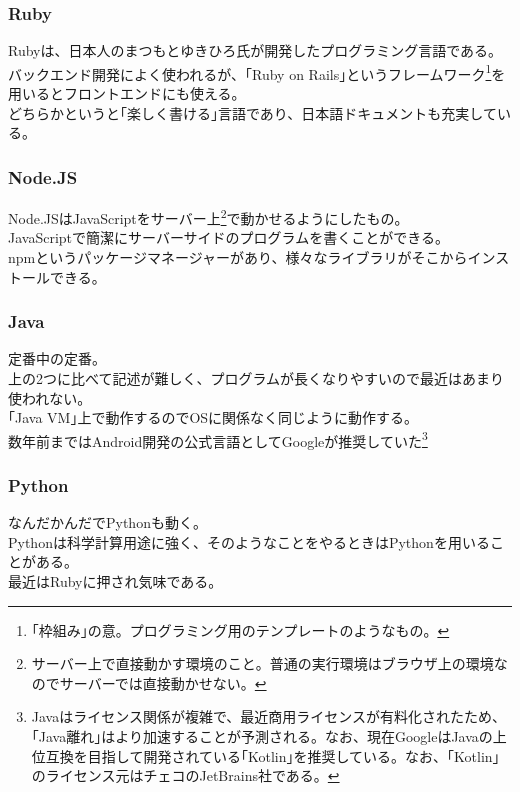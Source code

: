 \documentclass{ltjsarticle}
\begin{document}
\subsubsection{Ruby}
Rubyは、日本人のまつもとゆきひろ氏が開発したプログラミング言語である。\\
バックエンド開発によく使われるが、｢Ruby on Rails｣というフレームワーク\footnote[8]{｢枠組み｣の意。プログラミング用のテンプレートのようなもの。}を用いるとフロントエンドにも使える。\\
どちらかというと｢楽しく書ける｣言語であり、日本語ドキュメントも充実している。

\subsubsection{Node.JS}
Node.JSはJavaScriptをサーバー上\footnote[9]{サーバー上で直接動かす環境のこと。普通の実行環境はブラウザ上の環境なのでサーバーでは直接動かせない。}で動かせるようにしたもの。\\
JavaScriptで簡潔にサーバーサイドのプログラムを書くことができる。\\
npmというパッケージマネージャーがあり、様々なライブラリがそこからインストールできる。

\subsubsection{Java}
定番中の定番。\\
上の2つに比べて記述が難しく、プログラムが長くなりやすいので最近はあまり使われない。\\
｢Java VM｣上で動作するのでOSに関係なく同じように動作する。\\
数年前まではAndroid開発の公式言語としてGoogleが推奨していた\footnote[10]{Javaはライセンス関係が複雑で、最近商用ライセンスが有料化されたため、｢Java離れ｣はより加速することが予測される。なお、現在GoogleはJavaの上位互換を目指して開発されている｢Kotlin｣を推奨している。なお、｢Kotlin｣のライセンス元はチェコのJetBrains社である。}

\subsubsection{Python}
なんだかんだでPythonも動く。\\
Pythonは科学計算用途に強く、そのようなことをやるときはPythonを用いることがある。\\
最近はRubyに押され気味である。\\
\end{document}
